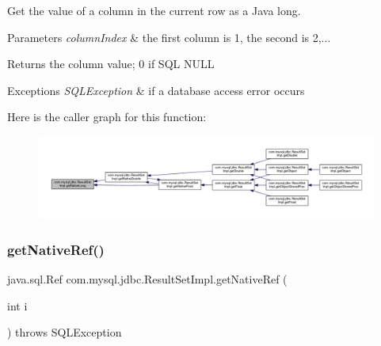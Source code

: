 Get the value of a column in the current row as a Java long.


\begin{DoxyParams}{Parameters}
{\em column\+Index} & the first column is 1, the second is 2,...\\
\hline
\end{DoxyParams}
\begin{DoxyReturn}{Returns}
the column value; 0 if S\+QL N\+U\+LL
\end{DoxyReturn}

\begin{DoxyExceptions}{Exceptions}
{\em S\+Q\+L\+Exception} & if a database access error occurs \\
\hline
\end{DoxyExceptions}
Here is the caller graph for this function\+:
\nopagebreak
\begin{figure}[H]
\begin{center}
\leavevmode
\includegraphics[width=350pt]{classcom_1_1mysql_1_1jdbc_1_1_result_set_impl_a490267a20e1362fb98cde92a6424706a_icgraph}
\end{center}
\end{figure}
\mbox{\label{classcom_1_1mysql_1_1jdbc_1_1_result_set_impl_ad943614b8eb9828bacf207844265f8b5}} 
\subsubsection{\texorpdfstring{get\+Native\+Ref()}{getNativeRef()}}
{\footnotesize\ttfamily java.\+sql.\+Ref com.\+mysql.\+jdbc.\+Result\+Set\+Impl.\+get\+Native\+Ref (\begin{DoxyParamCaption}\item[{int}]{i }\end{DoxyParamCaption}) throws S\+Q\+L\+Exception\hspace{0.3cm}{\ttfamily [protected]}}

